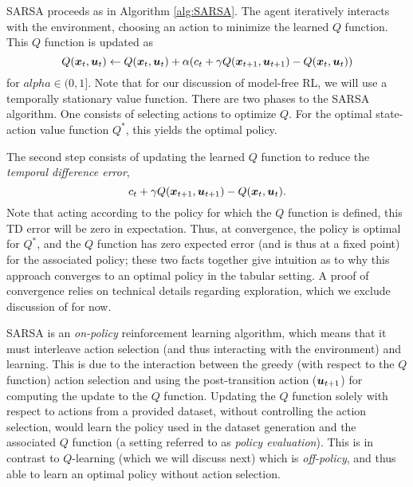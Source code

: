 SARSA proceeds as in Algorithm \ref{alg:SARSA}. The agent iteratively interacts with the environment, choosing an action to minimize the learned $Q$ function. This $Q$ function is updated as 
\begin{equation}
    Q(\bm{x}_t,\bm{u}_t) \gets Q(\bm{x}_t,\bm{u}_t) + \alpha (c_t + \gamma Q(\bm{x}_{t+1},\bm{u}_{t+1}) - Q(\bm{x}_t,\bm{u}_t))
\end{equation}
for $alpha \in (0,1]$. Note that for our discussion of model-free RL, we will use a temporally stationary value function. There are two phases to the SARSA algorithm. One consists of selecting actions to optimize $Q$. For the optimal state-action value function $Q^*$, this yields the optimal policy. 

The second step consists of updating the learned $Q$ function to reduce the \textit{temporal difference error},
\begin{equation}
c_t + \gamma Q(\bm{x}_{t+1},\bm{u}_{t+1}) - Q(\bm{x}_t,\bm{u}_t).
\end{equation}
Note that acting according to the policy for which the $Q$ function is defined, this TD error will be zero in expectation. Thus, at convergence, the policy is optimal for $Q^*$, and the $Q$ function has zero expected error (and is thus at a fixed point) for the associated policy; these two facts together give intuition as to why this approach converges to an optimal policy in the tabular setting. A proof of convergence relies on technical details regarding exploration, which we exclude discussion of for now. 



SARSA is an \textit{on-policy} reinforcement learning algorithm, which means that it must interleave action selection (and thus interacting with the environment) and learning. This is due to the interaction between the greedy (with respect to the $Q$ function) action selection and using the post-transition action ($\bm{u}_{t+1}$) for computing the update to the $Q$ function. Updating the $Q$ function solely with respect to actions from a provided dataset, without controlling the action selection, would learn the policy used in the dataset generation and the associated $Q$ function (a setting referred to as \textit{policy evaluation}). This is in contrast to $Q$-learning (which we will discuss next) which is \textit{off-policy}, and thus able to learn an optimal policy without action selection. 

